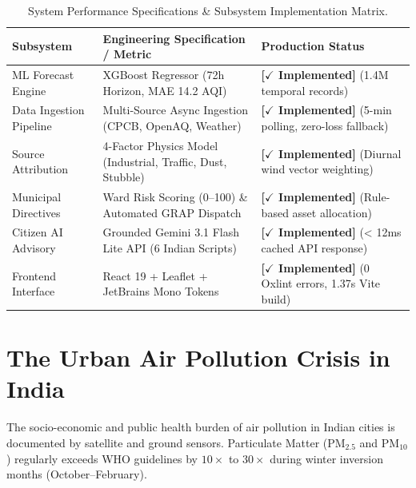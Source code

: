 \documentclass[11pt, a4paper]{article}
\newcommand{\statusimpl}{\textcolor{highlightgreen}{\textbf{[\ensuremath{\checkmark} Implemented]}}}
\begin{document}
\begin{table}[H]
\centering
\small
{}
\begin{tabularx}{\textwidth}{L{3.4cm} L{5.2cm} Y}
\toprule
{}
\textbf{Subsystem} & \textbf{Engineering Specification / Metric} & \textbf{Production Status} \\
\midrule
ML Forecast Engine & XGBoost Regressor (72h Horizon, MAE 14.2 AQI) & \statusimpl{} (1.4M temporal records) \\
Data Ingestion Pipeline & Multi-Source Async Ingestion (CPCB, OpenAQ, Weather) & \statusimpl{} (5-min polling, zero-loss fallback) \\
Source Attribution & 4-Factor Physics Model (Industrial, Traffic, Dust, Stubble) & \statusimpl{} (Diurnal wind vector weighting) \\
Municipal Directives & Ward Risk Scoring (0--100) \& Automated GRAP Dispatch & \statusimpl{} (Rule-based asset allocation) \\
Citizen AI Advisory & Grounded Gemini 3.1 Flash Lite API (6 Indian Scripts) & \statusimpl{} (< 12ms cached API response) \\
Frontend Interface & React 19 + Leaflet + JetBrains Mono Tokens & \statusimpl{} (0 Oxlint errors, 1.37s Vite build) \\
\bottomrule
\end{tabularx}
\caption{System Performance Specifications \& Subsystem Implementation Matrix.}
\end{table}

\section{The Urban Air Pollution Crisis in India}
The socio-economic and public health burden of air pollution in Indian cities is documented by satellite and ground sensors. Particulate Matter ($\text{PM}_{2.5}$ and $\text{PM}_{10}$) regularly exceeds WHO guidelines by $10\times$ to $30\times$ during winter inversion months (October--February).
\end{document}

